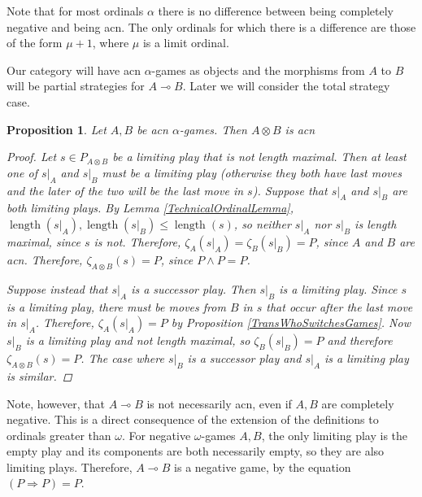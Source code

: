\documentclass[11pt]{article} %
\theoremstyle{plain} %
\newtheorem{proposition}[theorem]{Proposition}
\theoremstyle{definition} %
\theoremstyle{note}
\theoremstyle{exercisestyle}
\newcommand{\tensor}{\otimes}
\renewcommand{\implies}{\multimap}
\DeclareMathOperator{\length}{length}
\begin{document}
Note that for most ordinals $\alpha$ there is no difference between being completely negative and being acn.  The only ordinals for which there is  a difference are those of the form $\mu+1$, where $\mu$ is a limit ordinal.  

Our category will have acn $\alpha$-games as objects and the morphisms from $A$ to $B$ will be partial strategies for $A\implies B$.  Later we will consider the total strategy case.

\begin{proposition}
  \label{TensorIsAcn}
  Let $A,B$ be acn $\alpha$-games.  Then $A\tensor B$ is acn
  \begin{proof}
    Let $s\in P_{A\tensor B}$ be a limiting play that is not length maximal.  Then at least one of $s\vert_A$ and $s\vert_B$ must be a limiting play (otherwise they both have last moves and the later of the two will be the last move in $s$).  Suppose that $s\vert_A$ and $s\vert_B$ are both limiting plays.  By Lemma \ref{TechnicalOrdinalLemma}, $\length(s\vert_A),\length(s\vert_B)\le\length(s)$, so neither $s\vert_A$ nor $s\vert_B$ is length maximal, since $s$ is not.  Therefore, $\zeta_A(s\vert_A)=\zeta_B(s\vert_B)=P$, since $A$ and $B$ are acn.  Therefore, $\zeta_{A\tensor B}(s)=P$, since $P\wedge P=P$.

    Suppose instead that $s\vert_A$ is a successor play.  Then $s\vert_B$ is a limiting play.  Since $s$ is a limiting play, there must be moves from $B$ in $s$ that occur after the last move in $s\vert_A$.  Therefore, $\zeta_A(s\vert_A)=P$ by Proposition \ref{TransWhoSwitchesGames}.  Now $s\vert_B$ is a limiting play and not length maximal, so $\zeta_B(s\vert_B)=P$ and therefore $\zeta_{A\tensor B}(s)=P$.  The case where $s\vert_B$ is a successor play and $s\vert_A$ is a limiting play is similar.
  \end{proof}
\end{proposition}

Note, however, that $A\implies B$ is not necessarily acn, even if $A,B$ are completely negative.  This is a direct consequence of the extension of the definitions to ordinals greater than $\omega$.  For negative $\omega$-games $A,B$, the only limiting play is the empty play and its components are both necessarily empty, so they are also limiting plays.  Therefore, $A\implies B$ is a negative game, by the equation $(P\Rightarrow P) = P$.  
\end{document}
